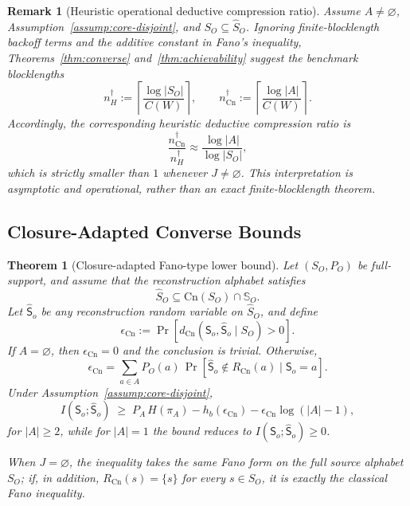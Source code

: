 \documentclass[journal,onecolumn]{IEEEtran}
\newcommand{\Cn}{\text{Cn}}
\newtheorem{theorem}{Theorem}[section]
\newtheorem{remark}{Remark}[section]
\numberwithin{equation}{section}
\begin{document}
\begin{remark}[Heuristic operational deductive compression ratio]
\label{rem:min-blocklength}
Assume \(A\neq\varnothing\),
Assumption~\textup{\ref{assump:core-disjoint}}, and
\(S_O\subseteq\hat S_O\).
Ignoring finite-blocklength backoff terms and the additive constant in
Fano's inequality, Theorems~\ref{thm:converse}
and~\ref{thm:achievability} suggest the benchmark blocklengths
\[
  n_H^\dagger
  :=
  \left\lceil \frac{\log|S_O|}{C(W)} \right\rceil,
  \qquad
  n_{\Cn}^\dagger
  :=
  \left\lceil \frac{\log|A|}{C(W)} \right\rceil.
\]
Accordingly, the corresponding heuristic deductive compression ratio is
\[
  \frac{n_{\Cn}^\dagger}{n_H^\dagger}
  \approx
  \frac{\log|A|}{\log|S_O|},
\]
which is strictly smaller than \(1\) whenever \(J\neq\varnothing\).
This interpretation is asymptotic and operational, rather than an
exact finite-blocklength theorem.
\end{remark}

\subsection{Closure-Adapted Converse Bounds}
\label{subsec:converse-bounds}

\begin{theorem}[Closure-adapted Fano-type lower bound]
\label{thm:semantic-fano-tight}
Let \((S_O,P_O)\) be full-support, and assume that the reconstruction
alphabet satisfies
\[
  \hat S_O\subseteq \Cn(S_O)\cap\mathbb{S}_O.
\]
Let \(\hat{\mathsf S}_o\) be any reconstruction random variable on
\(\hat S_O\), and define
\[
  \epsilon_{\Cn}
  :=
  \Pr[d_{\Cn}({\mathsf{S}}_o,\hat {\mathsf{S}}_o\mid S_O)>0].
\]
If \(A=\varnothing\), then \(\epsilon_{\Cn}=0\) and the conclusion is
trivial.
Otherwise,
\[
  \epsilon_{\Cn}
  =
  \sum_{a\in A}P_O(a)\,
  \Pr[\hat {\mathsf{S}}_o\notin R_{\Cn}(a)\mid {\mathsf{S}}_o=a].
\]
Under Assumption~\ref{assump:core-disjoint},
\begin{equation}\label{eq:sem-fano-tight}
  I({\mathsf{S}}_o;\hat {\mathsf{S}}_o)
  \;\ge\;
  P_A\,H(\pi_A)
  -h_b(\epsilon_{\Cn})
  -\epsilon_{\Cn}\log(|A|-1),
\end{equation}
for \(|A|\ge 2\), while for \(|A|=1\) the bound reduces to
\(I({\mathsf{S}}_o;\hat {\mathsf{S}}_o)\ge 0\).

When \(J=\varnothing\), the inequality takes the same Fano form on the
full source alphabet \(S_O\); if, in addition,
\(R_{\Cn}(s)=\{s\}\) for every \(s\in S_O\), it is exactly the
classical Fano inequality.
\end{theorem}
\end{document}
